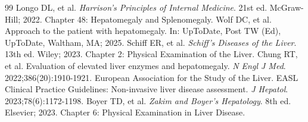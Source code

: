 \begin{thebibliography}{99}
 Longo DL, et al. \emph{Harrison's Principles of Internal Medicine}. 21st ed. McGraw-Hill; 2022. Chapter 48: Hepatomegaly and Splenomegaly.
 Wolf DC, et al. Approach to the patient with hepatomegaly. In: UpToDate, Post TW (Ed), UpToDate, Waltham, MA; 2025.
 Schiff ER, et al. \emph{Schiff's Diseases of the Liver}. 13th ed. Wiley; 2023. Chapter 2: Physical Examination of the Liver.
 Chung RT, et al. Evaluation of elevated liver enzymes and hepatomegaly. \emph{N Engl J Med}. 2022;386(20):1910-1921.
 European Association for the Study of the Liver. EASL Clinical Practice Guidelines: Non-invasive liver disease assessment. \emph{J Hepatol}. 2023;78(6):1172-1198.
 Boyer TD, et al. \emph{Zakim and Boyer's Hepatology}. 8th ed. Elsevier; 2023. Chapter 6: Physical Examination in Liver Disease.
\end{thebibliography}
